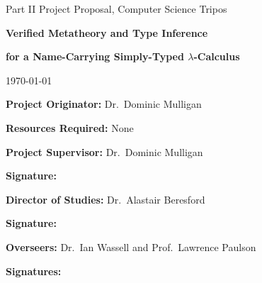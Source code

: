 \begin{titlepage}

\medskip
{}
\medskip
{}

\vfil

\centerline{\large Part II Project Proposal, Computer Science Tripos}
\vspace{0.4in}
\centerline{\Large\bf Verified Metatheory and Type Inference}
\centerline{\Large\bf for a Name-Carrying Simply-Typed \(\lambda\)-Calculus}
\vspace{0.3in}
\centerline{\large \today}

\vfil

{\bf Project Originator:} Dr.~Dominic Mulligan

\vspace{0.1in}

{\bf Resources Required:} None

\vspace{0.5in}

{\bf Project Supervisor:} Dr.~Dominic Mulligan

\vspace{0.2in}

{\bf Signature:}

\vspace{0.5in}

{\bf Director of Studies:} Dr.~Alastair Beresford

\vspace{0.2in}

{\bf Signature:}

\vspace{0.5in}

{\bf Overseers:} Dr.~Ian Wassell and Prof.~Lawrence Paulson

\vspace{0.2in}

{\bf Signatures:}

\vfil
\end{titlepage}
